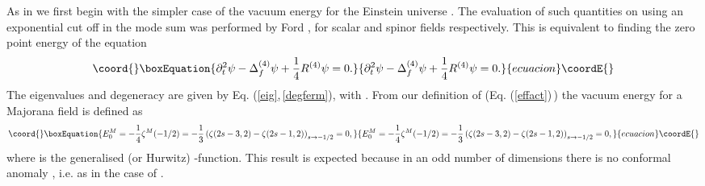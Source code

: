 \documentclass[a4paper,a4paper]{article}
\begin{document}
As in \cite{NS} we first begin with the simpler case of the vacuum energy for the
Einstein universe \coordHE{}. The evaluation of such quantities on 
\coordHE{}  using an exponential cut off in the mode sum was performed by 
Ford \cite{FORD,FORD2}, for scalar and spinor fields respectively.
This is equivalent to finding the zero point energy of the equation
\begin{equation}\coord{}\boxEquation{
\partial_t^2\psi-\Delta_f^{(4)}\psi+\frac{1}{4}R^{(4)}\psi=0.
}{
\partial_t^2\psi-\Delta_f^{(4)}\psi+\frac{1}{4}R^{(4)}\psi=0.
}{ecuacion}\coordE{}\end{equation}
The eigenvalues and degeneracy are given by Eq. (\ref{eig},\,\ref{degferm}), with 
\coordHE{}. From our definition of \coordHE{} (Eq. (\ref{effact})\,) the vacuum energy for a 
Majorana field is defined as
\begin{equation}\coord{}\boxEquation{
E_0^M=-\frac 1 4 \zeta^M(-1/2)=
-\frac{1}{3}\left(\zeta(2s-3,2)-\zeta(2s-1,2)\right)_{s\rightarrow -1/2}=0,
\label{ein}
}{
E_0^M=-\frac 1 4 \zeta^M(-1/2)=
-\frac{1}{3}\left(\zeta(2s-3,2)-\zeta(2s-1,2)\right)_{s\rightarrow -1/2}=0,
}{ecuacion}\coordE{}\end{equation}
where \coordHE{} is the generalised (or Hurwitz) \myHighlight{$\zeta$}\coordHE{}-function. 
This result is expected because in an odd number of dimensions there is no 
conformal anomaly \cite{BD}, i.e. as in the case of \coordHE{}.
\end{document}
